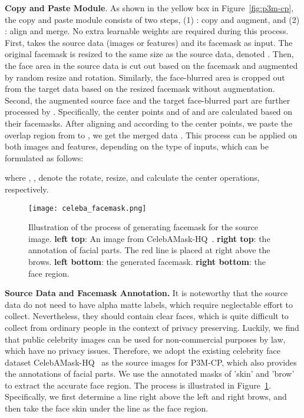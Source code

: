 \documentclass[twocolumn]{svjour3}
\begin{document}
\textbf{Copy and Paste Module}. As shown in the yellow box in Figure~\ref{fig:p3m-cp}, the copy and paste module  consists of two steps, (1) : copy and augment, and (2) : align and merge. No extra learnable weights are required during this process. First,  takes the source data  (images or features) and its facemask  as input. The original facemask is resized to the same size as the source data, denoted . Then, the face area  in the source data  is cut out based on the facemask  and augmented by random resize and rotation. Similarly, the face-blurred area  is cropped out from the target data  based on the resized facemask  without augmentation. Second, the augmented source face  and the target face-blurred part  are further processed by . Specifically, the center points  and  of  and  are calculated based on their facemasks. After aligning  and  according to the center points, we paste the overlap region from  to , we get the merged data . This  process can be applied on both images and features, depending on the type of inputs, which can be formulated as follows:



where , ,  denote the rotate, resize, and calculate the center operations, respectively.

\begin{figure}
    \centering
    \texttt{[image: celeba\_facemask.png]}
    \caption{Illustration of the process of generating facemask for the source image. \textbf{left top}: An image from CelebAMask-HQ~\citep{CelebAMask-HQ}. \textbf{right top}: the annotation of facial parts. The red line is placed at right above the brows. \textbf{left bottom}: the generated facemask. \textbf{right bottom}: the face region.}
    \label{fig:celeba_anno}
\end{figure}

\textbf{Source Data and Facemask Annotation.} 
It is noteworthy that the source data  do not need to have alpha matte labels, which require neglectable effort to collect. Nevertheless, they should contain clear faces, which is quite difficult to collect from ordinary people in the context of privacy preserving. Luckily, we find that public celebrity images can be used for non-commercial purposes by law, which have no privacy issues. Therefore, we adopt the existing celebrity face dataset CelebAMask-HQ~\citep{CelebAMask-HQ} as the source images for P3M-CP, which also provides the annotations of facial parts. We use the annotated masks of 'skin' and 'brow' to extract the accurate face region. The process is illustrated in Figure~\ref{fig:celeba_anno}. Specifically, we first determine a line right above the left and right brows, and then take the face skin under the line as the face region.
\end{document}
